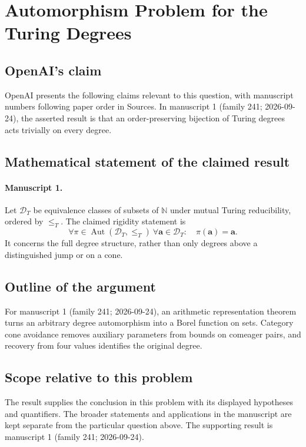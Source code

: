 \documentclass[11pt]{article}
\begin{document}
\section*{Automorphism Problem for the Turing Degrees}

\subsection{OpenAI's claim}
OpenAI presents the following claims relevant to this question, with manuscript numbers following paper order in Sources. In manuscript 1 (family 241; 2026-09-24), the asserted result is that an order-preserving bijection of Turing degrees acts trivially on every degree.

\subsection{Mathematical statement of the claimed result}
\paragraph{Manuscript 1.}
Let $\mathcal D_T$ be equivalence classes of subsets of $\mathbb N$ under mutual Turing reducibility, ordered by $\le_T$. The claimed rigidity statement is
\[
 \forall\pi\in\operatorname{Aut}(\mathcal D_T,\le_T)\ \forall\mathbf a\in\mathcal D_T:\quad\pi(\mathbf a)=\mathbf a.
\]
It concerns the full degree structure, rather than only degrees above a distinguished jump or on a cone.

\subsection{Outline of the argument}
For manuscript 1 (family 241; 2026-09-24), an arithmetic representation theorem turns an arbitrary degree automorphism into a Borel function on sets. Category cone avoidance removes auxiliary parameters from bounds on comeager pairs, and recovery from four values identifies the original degree.

\subsection{Scope relative to this problem}
The result supplies the conclusion in this problem with its displayed hypotheses and quantifiers. The broader statements and applications in the manuscript are kept separate from the particular question above. The supporting result is manuscript 1 (family 241; 2026-09-24).
\end{document}
